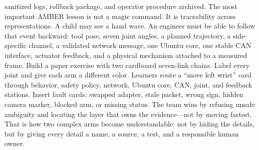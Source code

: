 \markdownRendererUlItem \markdownRendererUntickedBox{} sanitized logs, rollback package, and operator procedure archived.\markdownRendererUlItemEnd 
\markdownRendererUlEnd \markdownRendererInterblockSeparator
{}
\markdownRendererSectionEnd \markdownRendererSectionBegin
{}\markdownRendererInterblockSeparator
{}The most important AMBER lesson is not a magic command. It is traceability across representations. A child may see a hand wave. An engineer must be able to follow that event backward: tool pose, seven joint angles, a planned trajectory, a side-specific channel, a validated network message, one Ubuntu core, one stable CAN interface, actuator feedback, and a physical mechanism attached to a measured frame.\markdownRendererParagraphSeparator
{}Build a paper exercise with two cardboard seven-link chains. Label every joint and give each arm a different color. Learners route a “move left wrist” card through behavior, safety policy, network, Ubuntu core, CAN, joint, and feedback stations. Insert fault cards: swapped adapter, stale packet, wrong sign, hidden camera marker, blocked arm, or missing status. The team wins by refusing unsafe ambiguity and locating the layer that owns the evidence—not by moving fastest.\markdownRendererParagraphSeparator
{}That is how two complex arms become understandable: not by hiding the details, but by giving every detail a name, a source, a test, and a responsible human owner.
\markdownRendererSectionEnd \markdownRendererDocumentEnd